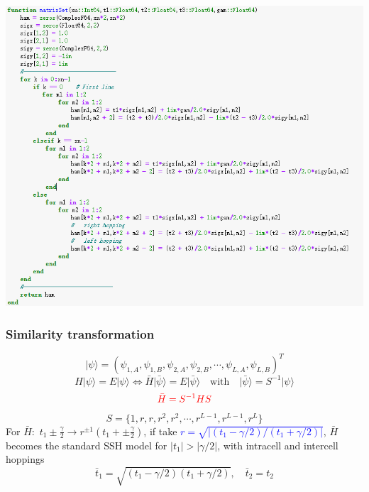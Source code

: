 \documentclass{beamer}
\begin{document}
\begin{frame}
\centering
\includegraphics[scale=0.6]{figure/code1.png}
\end{frame}
  \begin{frame}
    \frametitle{Similarity transformation}
    $$\rvert\psi\rangle=(\psi_{1,A},\psi_{1,B},\psi_{2,A},\psi_{2,B},\cdots,\psi_{L,A},\psi_{L,B})^T$$
    \begin{equation}
    H\rvert\psi\rangle=E\rvert\psi\rangle\Leftrightarrow	\bar{H}\rvert\bar{\psi}\rangle=E\rvert\bar{\psi}\rangle\quad \text{with}\quad \rvert\bar{\psi}\rangle=S^{-1}\rvert\psi\rangle
    \end{equation}
    \begin{equation}
    \textcolor{red}{\bar{H}=S^{-1}HS}
    \end{equation}
    $$S=\{1,r,r,r^2,r^2,\cdots,r^{L-1},r^{L-1},r^L\}$$
    For $\bar{H}:$ $t_1\pm\frac{\gamma}{2}\rightarrow r^{\pm 1}(t_1+\pm\frac{\gamma}{2})$, if take \textcolor{blue}{$r=\sqrt{|(t_1-\gamma/2)/(t_1+\gamma/2)|}$}, $\bar{H}$ becomes the standard SSH model for $|t_1|>|\gamma/2|$, with intracell and intercell hoppings 
    \begin{equation}
    \bar{t}_1=\sqrt{(t_1-\gamma/2)(t_1+\gamma/2)},\quad \bar{t}_2=t_2
    \end{equation}
   
  \end{frame}
\end{document}
